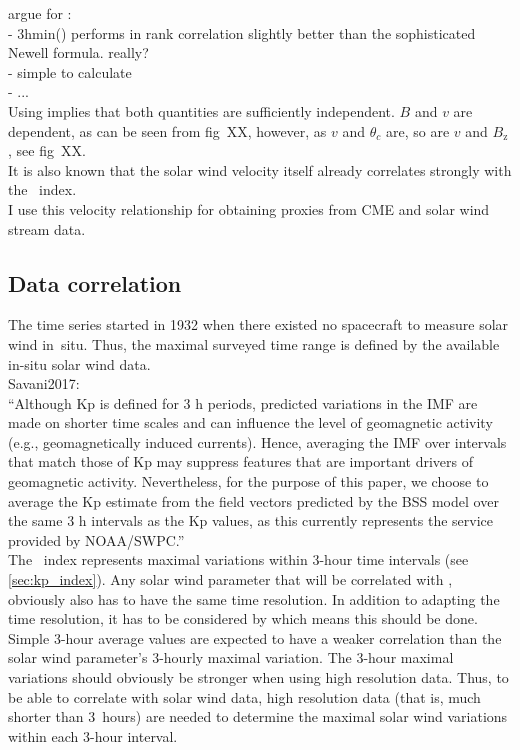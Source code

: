 argue for \vBz:\\
- 3hmin(\vBz) performs in rank correlation slightly better than the sophisticated Newell formula. really?\\
- simple to calculate\\
- ...\\


Using \vBz{} implies that both quantities are sufficiently independent. $B$ and $v$ are dependent, as can be seen from fig~XX, however, as $v$ and $\theta_c$ are, so are $v$ and $B_\text{z}$, see fig~XX.\\


It is also known that the solar wind velocity itself already correlates strongly with the \Kp~index.\\

I use this velocity relationship for obtaining \Kp{} proxies from CME and solar wind stream data.\\


\subsection{Data correlation}
\label{sec:data_correlation}
The \Kp{} time series started in 1932 when there existed no spacecraft to measure solar wind in~situ. Thus, the maximal surveyed time range is defined by the available in-situ solar wind data.\\

Savani2017:\\
``Although Kp is defined for 3 h periods, predicted variations in the IMF are made on shorter time scales and can influence the level of geomagnetic activity (e.g., geomagnetically induced currents). Hence, averaging the IMF over intervals that match those of Kp may suppress features that are important drivers of geomagnetic activity. Nevertheless, for the purpose of this paper, we choose to average the Kp estimate from the field vectors predicted by the BSS model over the same 3 h intervals as the Kp values, as this currently represents the service provided by NOAA/SWPC.''\\

The \Kp{}~index represents maximal variations within 3-hour time intervals (see \autoref{sec:kp_index}). Any solar wind parameter that will be correlated with \Kp{}, obviously also has to have the same time resolution. In addition to adapting the time resolution, it has to be considered by which means this should be done. Simple 3-hour average values are expected to have a weaker correlation than the solar wind parameter's 3-hourly maximal variation.
The 3-hour maximal variations should obviously be stronger when using high resolution data. Thus, to be able to correlate \Kp{} with solar wind data, high resolution data (that is, much shorter than 3~hours) are needed to determine the maximal solar wind variations within each 3-hour interval.\\

